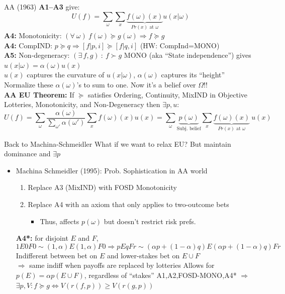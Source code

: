 \begin{frame}{AA (1963)}
\textbf{A1--A3} give:
$$
    U(f) = \sum_\omega \sum_x \underbrace{f(\omega)(x)}_{Pr(x)\text{ at }\omega} u(x|\omega)
$$
\textbf{A4:} Monotonicity: $(\forall\ \omega)\ f(\omega)\succeq g(\omega) \Rightarrow f\succeq g$\\
\textbf{A4:} CompIND: $p \succeq q \Rightarrow [f|p,i] \succeq [f|q,i]$ (HW: CompInd=MONO)\\
\textbf{A5:} Non-degeneracy: $(\exists\, f,g)\ :\ f\succ g$
\br
MONO (aka ``State independence'') gives $u(x|\omega)=\alpha(\omega) u(x)$\\
$u(x)$ captures the curvature of $u(x|\omega)$, $\alpha(\omega)$ captures its ``height''
\br
Normalize these $\alpha(\omega)$'s to sum to one. Now it's a belief over $\Omega$!!\\
\textbf{AA EU Theorem:} If $\succeq$ satisfies Ordering, Continuity, MixIND in Objective Lotteries, Monotonicity, and Non-Degeneracy then $\exists p,u$:
$$
U(f) = \sum_\omega \frac{\alpha(\omega)}{\sum_{\omega'}\alpha(\omega')} \sum_x f(\omega)(x)u(x) = \sum_\omega \underbrace{p(\omega)}_{\text{Subj. belief}} \sum_x \underbrace{f(\omega)(x)}_{Pr(x)\text{ at }\omega}\ u(x)
$$
\end{frame}

\begin{frame}{Back to Machina-Schmeidler}
What if we want to relax EU? But maintain dominance and $\exists p$
\begin{itemize}
    \item Machina Schmeidler (1995): Prob. Sophistication in AA world
    \begin{enumerate}
        \item Replace A3 (MixIND) with FOSD Monotonicity
        \item Replace A4 with an axiom that only applies to two-outcome bets
        \begin{itemize}
            \item Thus, affects $p(\omega)$ but doesn't restrict risk prefs.
        \end{itemize}
    \end{enumerate}
    \textbf{A4*:} for disjoint $E$ and $F$,
    $$
        1E0F0 \sim (1,\alpha)E(1,\alpha)F0 \Rightarrow pEqFr \sim (\alpha p+(1-\alpha)q)E(\alpha p+(1-\alpha)q)Fr
    $$
    \br
    Indifferent between bet on $E$ and lower-stakes bet on $E\cup F$\\
    $\Rightarrow$ same indiff when payoffs are replaced by lotteries
    \br
    Allows for $p(E)=\alpha p(E\cup F)$, regardless of ``stakes''
    \br
    A1,A2,FOSD-MONO,A4* $\Rightarrow$ $\exists p,V: f\succeq g \iff V(r(f,p))\geq V(r(g,p))$
\end{itemize}
\end{frame}

